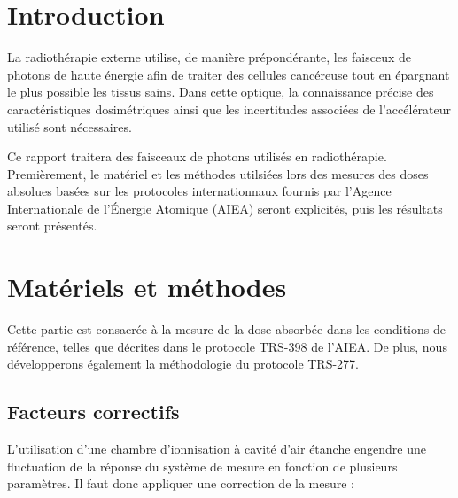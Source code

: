 \documentclass{article}
\begin{document}




\onehalfspacing

\pagestyle{fancy}
	\renewcommand\headrulewidth{0.5pt}
	\renewcommand\footrulewidth{0.5pt}
	\fancyfoot[R]{\thepage}

\tableofcontents
\clearpage
\section{Introduction}

La radiothérapie externe utilise, de manière prépondérante, les faisceux de photons de haute énergie afin de traiter des cellules cancéreuse tout en épargnant le plus possible les tissus sains. Dans cette optique, la connaissance précise des caractéristiques dosimétriques ainsi que les incertitudes associées de l'accélérateur utilisé sont nécessaires. 

Ce rapport traitera des faisceaux de photons utilisés en radiothérapie. Premièrement, le matériel et les méthodes utilsiées lors des mesures des doses absolues basées sur les protocoles internationnaux fournis par l'Agence Internationale de l'Énergie Atomique (AIEA) seront explicités, puis les résultats seront présentés. 

\section{Matériels et méthodes}

Cette partie est consacrée à la mesure de la dose absorbée dans les conditions de référence, telles que décrites dans le protocole TRS-398 de l'AIEA. De plus, nous développerons également la méthodologie du protocole TRS-277.

\subsection{Facteurs correctifs}

L'utilisation d'une chambre d'ionnisation à cavité d'air étanche engendre une fluctuation de la réponse du système de mesure en fonction de plusieurs paramètres. Il faut donc appliquer une correction de la mesure :
\end{document}
